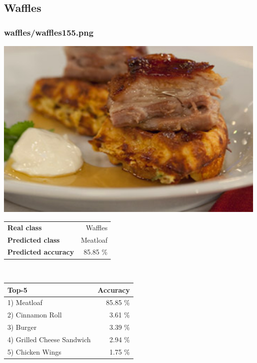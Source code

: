 \subsection{Waffles}
    
\subsubsection{waffles/waffles155.png}

\begin{minipage}[t]{0.4\textwidth}
	\vspace{0pt}
	\includegraphics[width=\linewidth]{images/evaluation-images/waffles/waffles155.png}
\end{minipage}
\hfill
\begin{minipage}[t]{0.5\textwidth}
	\vspace{0pt}\raggedright
	\begin{tabularx}{\textwidth}{X r}
		\small \textbf{Real class} & \small Waffles\\
		\small \textbf{Predicted class} & \small Meatloaf\\
		\small \textbf{Predicted accuracy} & \small 85.85 \%
    \end{tabularx}\\
    
    \vspace{6pt}
	\begin{tabularx}{\textwidth}{X r}
        \small \textbf{Top-5} & \small \textbf{Accuracy} \\
        \hline
		\small 1) Meatloaf & \small 85.85 \%\\\small 2) Cinnamon Roll & \small 3.61 \%\\\small 3) Burger & \small 3.39 \%\\\small 4) Grilled Cheese Sandwich & \small 2.94 \%\\\small 5) Chicken Wings & \small 1.75 \%
    \end{tabularx}
\end{minipage}
    

